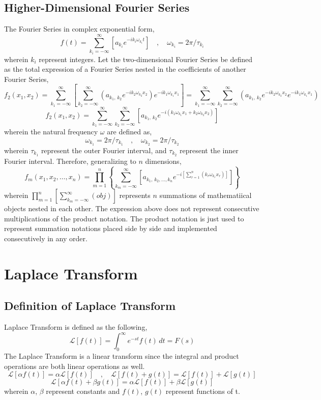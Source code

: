 \documentclass[a4paper, 12pt]{report}
\def\w{\omega}
\def\a{\alpha}
\def\be{\beta}
\def\l{\left}
\def\r{\right}
\def\dst{\displaystyle}
\def\lap{\mathcal{L}}
\let\stdsection\section
\renewcommand\section{\newpage\stdsection}
\begin{document}
\begin{center}
\subsection{Higher-Dimensional Fourier Series}
The Fourier Series in complex exponential form,
$$f(t) = \sum^{\infty}_{k_i = -\infty}\l[a_{k_i}e^{-ik_i\w_{k_i}t}\r]\quad,\quad \w_{k_i} = 2\pi/\tau_{k_i}$$
wherein $k_i$ represent integers. Let the two-dimensional Fourier Series be defined as the total expression of a Fourier Series nested in the coefficients of another Fourier Series,
$$f_2(x_1,x_2) = \sum^{\infty}_{k_1 = -\infty}\l[\sum^{\infty}_{k_2 = -\infty}\l(a_{k_1,\,k_2}e^{-ik_2\w_{k_2}x_2}\r)e^{-ik_1\w_{k_1}x_1}\r] = \sum^{\infty}_{k_1 = -\infty}\sum^{\infty}_{k_2 = -\infty}\l(a_{k_1,\,k_2}e^{-ik_2\w_{k_2}x_2}e^{-ik_1\w_{k_1}x_1}\r)$$
$$f_2(x_1,x_2) = \sum^{\infty}_{k_1 = -\infty}\sum^{\infty}_{k_2 = -\infty}\l[a_{k_1,\,k_2}e^{-i(k_1\w_{k_1}x_1+k_2\w_{k_2}x_2)}\r]$$
wherein the natural frequency $\w$ are defined as,
$$\w_{k_1} = 2\pi/\tau_{k_1} \quad,\quad \w_{k_2} = 2\pi/\tau_{k_2}$$
wherein $\tau_{k_1}$ represent the outer Fourier interval, and $\tau_{k_2}$ represent the inner Fourier interval. Therefore, generalizing to $n$ dimensions,
$$f_m(x_1,x_2,\dots,x_n) = \prod^{n}_{m=1}\l\{\sum^{\infty}_{k_m = -\infty}\l[a_{k_1,\,k_2,\dots,k_n}e^{-i\l[\sum^{n}_{r=1}\l(k_r\w_{k_r}x_r\r)\r]}\r]\r\}$$
wherein $\dst{\prod^{n}_{m=1}\l[\sum^{\infty}_{k_m = -\infty}(obj)\r]}$ represents $n$ summations of mathematiical objects nested in each other. The expression above does not represent consecutive multiplications of the product notation. The product notation is just used to represent summation notations placed side by side and implemented consecutively in any order. 
\section{Laplace Transform}
\begin{comment}
Laplace Transform Header
\end{comment}
\subsection{Definition of Laplace Transform}
Laplace Transform is defined as the following,
$$\lap[f(t)] = \int^{\infty}_{0}e^{-st}f(t)\,dt = F(s)$$
The Laplace Transform is a linear transform since the integral and product operations are both linear operations as well.
$$\lap[\a f(t)] = \a\lap[f(t)]\quad,\quad\lap[f(t) + g(t)] = \lap[f(t)] + \lap[g(t)]$$
$$\lap[\a f(t) + \be g(t)] = \a\lap[f(t)] + \be\lap[g(t)]$$
wherein $\a$, $\be$ represent constants and $f(t)$, $g(t)$ represent functions of t.

\end{center}
\end{document}
